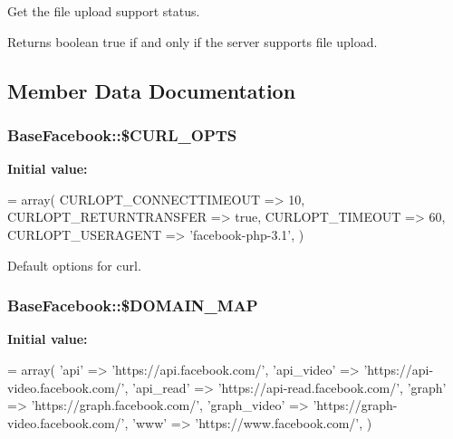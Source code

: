 Get the file upload support status.

\begin{DoxyReturn}{Returns}
boolean true if and only if the server supports file upload. 
\end{DoxyReturn}


\subsection{Member Data Documentation}
\hypertarget{class_base_facebook_ad48ad58bc8120acf03f199bb100be6dd}{
\subsubsection[{\$\-C\-U\-R\-L\-\_\-\-O\-P\-T\-S}]{\setlength{\rightskip}{0pt plus 5cm}Base\-Facebook\-::\$\-C\-U\-R\-L\-\_\-\-O\-P\-T\-S\hspace{0.3cm}{\ttfamily [static]}}}\label{class_base_facebook_ad48ad58bc8120acf03f199bb100be6dd}
{\bfseries Initial value\-:}
\begin{DoxyCode}
= array(
    CURLOPT\_CONNECTTIMEOUT => 10,
    CURLOPT\_RETURNTRANSFER => \textcolor{keyword}{true},
    CURLOPT\_TIMEOUT        => 60,
    CURLOPT\_USERAGENT      => \textcolor{stringliteral}{'facebook-php-3.1'},
  )
\end{DoxyCode}
Default options for curl. \hypertarget{class_base_facebook_a154dee18518e85547854c5d51f77e314}{
\subsubsection[{\$\-D\-O\-M\-A\-I\-N\-\_\-\-M\-A\-P}]{\setlength{\rightskip}{0pt plus 5cm}Base\-Facebook\-::\$\-D\-O\-M\-A\-I\-N\-\_\-\-M\-A\-P\hspace{0.3cm}{\ttfamily [static]}}}\label{class_base_facebook_a154dee18518e85547854c5d51f77e314}
{\bfseries Initial value\-:}
\begin{DoxyCode}
= array(
    \textcolor{stringliteral}{'api'}       => \textcolor{stringliteral}{'https://api.facebook.com/'},
    \textcolor{stringliteral}{'api\_video'} => \textcolor{stringliteral}{'https://api-video.facebook.com/'},
    \textcolor{stringliteral}{'api\_read'}  => \textcolor{stringliteral}{'https://api-read.facebook.com/'},
    \textcolor{stringliteral}{'graph'}     => \textcolor{stringliteral}{'https://graph.facebook.com/'},
    \textcolor{stringliteral}{'graph\_video'} => \textcolor{stringliteral}{'https://graph-video.facebook.com/'},
    \textcolor{stringliteral}{'www'}       => \textcolor{stringliteral}{'https://www.facebook.com/'},
  )
\end{DoxyCode}
